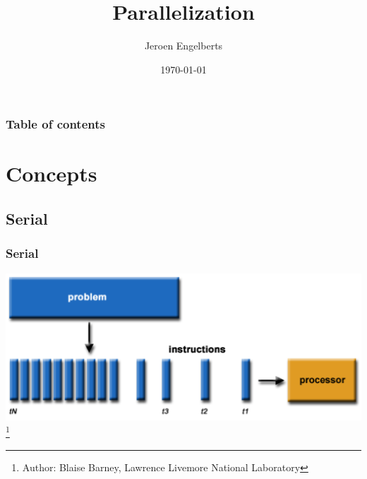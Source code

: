 \documentclass[hyperref={pdfpagelabels=false}]{beamer}
\title{Parallelization}
\subtitle{}
\author{Jeroen Engelberts}
\institute[SURFsara]{PhD Theoritical Chemistry\par Consultant for Cartesius and Lisa}
\date{\today}
\newcommand\blfootnote[1]{%
   \begingroup
   \renewcommand\thefootnote{}\footnote{#1}%
   \addtocounter{footnote}{-1}%
   \endgroup
}
\begin{document}
    \begin{frame}
        \titlepage
    \end{frame}



    \begin{frame}
        \frametitle{Table of contents}
        \tableofcontents
    \end{frame} 


    \section{Concepts} 
    \subsection{Serial}
    \begin{frame}
        \frametitle{Serial}
        \begin{center}
            \includegraphics[scale=0.4]{images/serial.png}
            \blfootnote{\tiny{Author: Blaise Barney, Lawrence Livemore National Laboratory}}
        \end{center}
    \end{frame}
    
\end{document}

